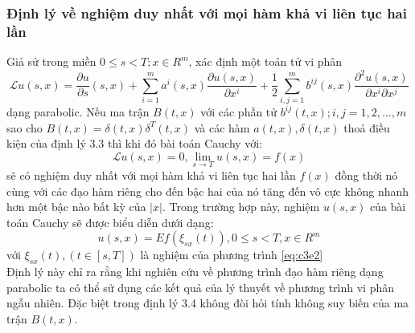 \documentclass[14pt,a4paper]{article}
\numberwithin{equation}{section}
\begin{document}
\subsubsection{Định lý về nghiệm duy nhất với mọi hàm khả vi liên tục hai lần}
Giả sử trong miền $0\leq s<T;x\in R^m$, xác định một toán tử vi phân
\begin{equation*}
	\mathscr{L}u(s,x)=\dfrac{\partial u}{\partial s}(s,x)+\sum_{i=1}^{m}a^i(s,x)\dfrac{\partial u(s,x)}{\partial x^i}+\dfrac{1}{2}\sum_{i,j=1}^{m}b^{ij}(s,x)\dfrac{\partial^2u(s,x)}{\partial x^i\partial x^j}
\end{equation*}
dạng parabolic. Nếu ma trận $B(t,x)$ với các phần tử $b^{ij}(t,x);i,j=1,2,...,m$ sao cho $B(t,x)=\delta(t,x)\delta^T(t,x)$ và các hàm $a(t,x),\delta(t,x)$ thoả điều kiện của định lý 3.3 thì khi đó bài toán Cauchy với:
\begin{equation*}
	\mathscr{L}u(s,x)=0,\lim\limits_{s\rightarrow T}u(s,x)=f(x)
\end{equation*} 
sẽ có nghiệm duy nhất với mọi hàm khả vi liên tục hai lần $f(x)$ đồng thời nó cùng với các đạo hàm riêng cho đến bậc hai của nó tăng đến vô cực không nhanh hơn một bậc nào bất kỳ của $|x|$. Trong trường hợp này, nghiệm $u(s,x)$ của bài toán Cauchy sẽ được biểu diễn dưới dạng:
\begin{equation*}
	u(s,x)=Ef(\xi_{sx}(t)),0\leq s<T,x\in R^m
\end{equation*}
với $\xi_{sx}(t),(t\in[s,T])$ là nghiệm của phương trình \eqref{eq:c3e2}\\
Định lý này chỉ ra rằng khi nghiên cứu về phương trình đạo hàm riêng dạng parabolic ta có thể sử dụng các kết quả của lý thuyết về phương trình vi phân ngẫu nhiên. Đặc biệt trong định lý 3.4 không đòi hỏi tính không suy biến của ma trận $B(t,x)$.\\
\end{document}
